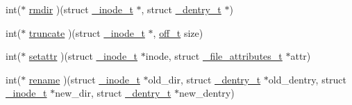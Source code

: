 \begin{DoxyCompactItemize}
int($\ast$ \hyperlink{struct__fs__instance__t_a4ceb71ff00d0a5fda03aa644c4694bef}{rmdir} )(struct \hyperlink{struct__inode__t}{\+\_\+inode\+\_\+t} $\ast$, struct \hyperlink{struct__dentry__t}{\+\_\+dentry\+\_\+t} $\ast$)
\item 
int($\ast$ \hyperlink{struct__fs__instance__t_a02c8b56a14997bf58d8350a26e441954}{truncate} )(struct \hyperlink{struct__inode__t}{\+\_\+inode\+\_\+t} $\ast$, \hyperlink{libc_2include_2sys_2types_8h_a447a6a64dbb8fb44b1e62856b333db4a}{off\+\_\+t} size)
\item 
int($\ast$ \hyperlink{struct__fs__instance__t_ae76a7f1f9c4653baa497343bf26918a6}{setattr} )(struct \hyperlink{struct__inode__t}{\+\_\+inode\+\_\+t} $\ast$inode, struct \hyperlink{struct__file__attributes__t}{\+\_\+file\+\_\+attributes\+\_\+t} $\ast$attr)
\item 
int($\ast$ \hyperlink{struct__fs__instance__t_a62e37513c47dda9d11e534cf84d6f48b}{rename} )(struct \hyperlink{struct__inode__t}{\+\_\+inode\+\_\+t} $\ast$old\+\_\+dir, struct \hyperlink{struct__dentry__t}{\+\_\+dentry\+\_\+t} $\ast$old\+\_\+dentry, struct \hyperlink{struct__inode__t}{\+\_\+inode\+\_\+t} $\ast$new\+\_\+dir, struct \hyperlink{struct__dentry__t}{\+\_\+dentry\+\_\+t} $\ast$new\+\_\+dentry)
\end{DoxyCompactItemize}


